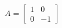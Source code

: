 \documentclass[preview]{standalone}
\begin{document}
\begin{center}
$\displaystyle A=\left[\begin{matrix}1 & 0\\0 & -1\end{matrix}\right]$
\end{center}
\end{document}
